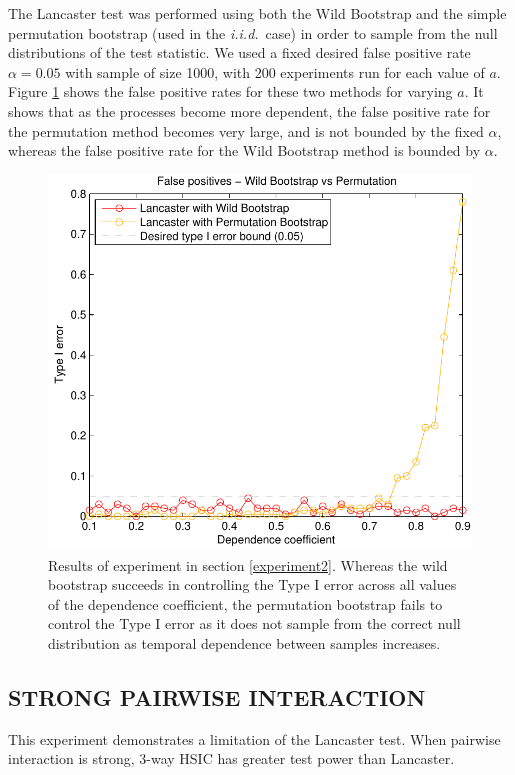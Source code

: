 \documentclass[]{article}
\begin{document}
The Lancaster test was performed using both the Wild Bootstrap and the simple permutation bootstrap (used in the \emph{i.i.d.}~case) in order to sample from the null distributions of the test statistic. We used a fixed desired false positive rate $\alpha = 0.05$ with sample of size 1000, with 200 experiments run for each value of $a$. Figure \ref{wildBootstrap_is_necessary} shows the false positive rates for these two methods for varying $a$. It shows that as the processes become more dependent, the false positive rate for the permutation method becomes very large, and is not bounded by the fixed $\alpha$, whereas the false positive rate for the Wild Bootstrap method is bounded by $\alpha$.
\begin{figure}[ht]
\vskip 0.2in
\begin{center}
\centerline{\includegraphics[scale=0.6]{UAI_Figure2.pdf}}
\caption{Results of experiment in section \ref{experiment2}. Whereas the wild bootstrap succeeds in controlling the Type I error across all values of the dependence coefficient, the permutation bootstrap fails to control the Type I error as it does not sample from the correct null distribution as temporal dependence between samples increases.}
\label{wildBootstrap_is_necessary}
\end{center}
\vskip -0.2in
\end{figure} 


\subsection{STRONG PAIRWISE INTERACTION}\label{experiment3}
This experiment demonstrates a limitation of the Lancaster test. When pairwise interaction is strong, 3-way HSIC has greater test power than Lancaster.
\end{document}

